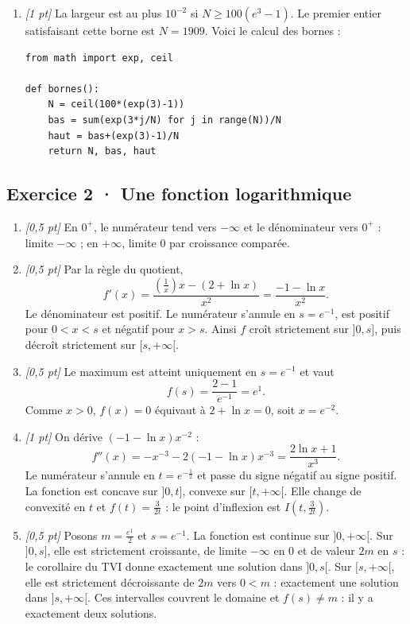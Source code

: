 \begin{enumerate}

\item \textit{[1 pt]} La largeur est au plus $10^{-2}$ si $N\ge100(e^{3}-1)$. Le premier entier satisfaisant cette borne est $N=1909$. Voici le calcul des bornes :
\begin{lstlisting}
from math import exp, ceil

def bornes():
    N = ceil(100*(exp(3)-1))
    bas = sum(exp(3*j/N) for j in range(N))/N
    haut = bas+(exp(3)-1)/N
    return N, bas, haut
\end{lstlisting}


\end{enumerate}

\subsection*{Exercice 2 · Une fonction logarithmique}\begin{enumerate}

\item \textit{[0{,}5 pt]} En $0^+$, le numérateur tend vers $-\infty$ et le dénominateur vers $0^+$ : limite $-\infty$ ; en $+\infty$, limite $0$ par croissance comparée.

\item \textit{[0{,}5 pt]} Par la règle du quotient,
\[f'(x)=\frac{(\frac{1}{x})x-(2+\ln x)}{x^2}=\frac{-1-\ln x}{x^2}.\]
Le dénominateur est positif. Le numérateur s'annule en $s=e^{-1}$, est positif pour $0<x<s$ et négatif pour $x>s$. Ainsi $f$ croît strictement sur $]0,s]$, puis décroît strictement sur $[s,+\infty[$.

\item \textit{[0{,}5 pt]} Le maximum est atteint uniquement en $s=e^{-1}$ et vaut
\[f(s)=\frac{2- 1}{e^{-1}}=e^{1}.\]
Comme $x>0$, $f(x)=0$ équivaut à $2+\ln x=0$, soit $x=e^{-2}$.

\item \textit{[1 pt]} On dérive $(-1-\ln x)x^{-2}$ :
\[f''(x)=-x^{-3}-2(-1-\ln x)x^{-3}=\frac{2\ln x+1}{x^3}.\]
Le numérateur s'annule en $t=e^{-\frac{1}{2}}$ et passe du signe négatif au signe positif. La fonction est concave sur $]0,t]$, convexe sur $[t,+\infty[$. Elle change de convexité en $t$ et $f(t)=\frac{3}{2t}$ : le point d'inflexion est $I(t,\frac{3}{2t})$.

\item \textit{[0{,}5 pt]} Posons $m=\frac{e^{1}}{2}$ et $s=e^{-1}$. La fonction est continue sur $]0,+\infty[$. Sur $]0,s]$, elle est strictement croissante, de limite $-\infty$ en $0$ et de valeur $2m$ en $s$ : le corollaire du TVI donne exactement une solution dans $]0,s[$. Sur $[s,+\infty[$, elle est strictement décroissante de $2m$ vers $0<m$ : exactement une solution dans $]s,+\infty[$. Ces intervalles couvrent le domaine et $f(s)\ne m$ : il y a exactement deux solutions.


\end{enumerate}
